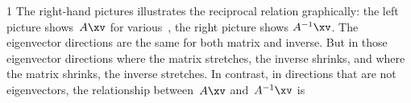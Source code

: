 \begin{example}
\begin{itemize}
\begin{figbox}{1
\quad {}}%
The right-hand pictures illustrates the reciprocal relation graphically:
the left picture shows~\(A\xv\) for various~\xv, the right picture shows \(A^{-1}\xv\).
The eigenvector directions are the same for both matrix and inverse.
But in those eigenvector directions where the matrix stretches, the inverse shrinks, and where the matrix shrinks, the inverse stretches.
In contrast, in directions that are not eigenvectors, the  relationship between~\(A\xv\) and~\(A^{-1}\xv\) is 
\aqed
\end{figbox}

\end{itemize}
\end{example}




